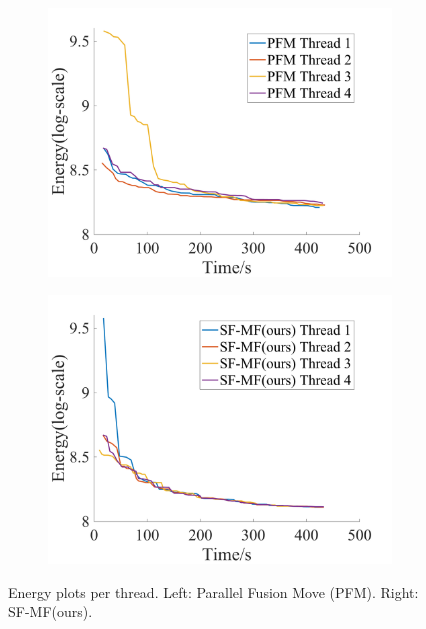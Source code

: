 \begin{figure}[!ht]
  \centering
  \begin{subfigure}[b]{0.49\columnwidth}
    \centering
    \includegraphics[width=\columnwidth]{figure/optical_flow_PFM_threads.png}
  \end{subfigure}  
  \begin{subfigure}[b]{0.49\columnwidth}
    \centering
    \includegraphics[width=\columnwidth]{figure/optical_flow_SF_MF_threads.png}
  \end{subfigure}
  \caption{Energy plots per thread. Left: Parallel Fusion  
    Move (PFM). Right: SF-MF(ours).}
  \label{fig:optical_flow_by_threads}  
\end{figure}

